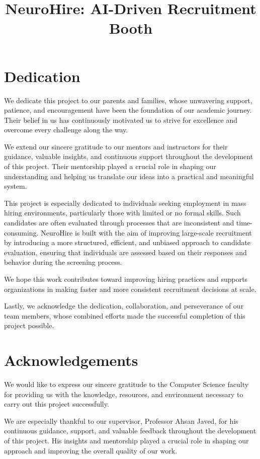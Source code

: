 \documentclass[12pt,twosided]{report}
\title{NeuroHire: AI-Driven Recruitment Booth}
\begin{document}

\chapter*{Dedication}
We dedicate this project to our parents and families, whose unwavering support, patience, and encouragement have been the foundation of our academic journey. Their belief in us has continuously motivated us to strive for excellence and overcome every challenge along the way.

We extend our sincere gratitude to our mentors and instructors for their guidance, valuable insights, and continuous support throughout the development of this project. Their mentorship played a crucial role in shaping our understanding and helping us translate our ideas into a practical and meaningful system.

This project is especially dedicated to individuals seeking employment in mass hiring environments, particularly those with limited or no formal skills. Such candidates are often evaluated through processes that are inconsistent and time-consuming. NeuroHire is built with the aim of improving large-scale recruitment by introducing a more structured, efficient, and unbiased approach to candidate evaluation, ensuring that individuals are assessed based on their responses and behavior during the screening process.

We hope this work contributes toward improving hiring practices and supports organizations in making faster and more consistent recruitment decisions at scale.

Lastly, we acknowledge the dedication, collaboration, and perseverance of our team members, whose combined efforts made the successful completion of this project possible.

\chapter*{Acknowledgements}
We would like to express our sincere gratitude to the Computer Science faculty for providing us with the knowledge, resources, and environment necessary to carry out this project successfully.

We are especially thankful to our supervisor, Professor Ahsan Javed, for his continuous guidance, support, and valuable feedback throughout the development of this project. His insights and mentorship played a crucial role in shaping our approach and improving the overall quality of our work.
\end{document}
